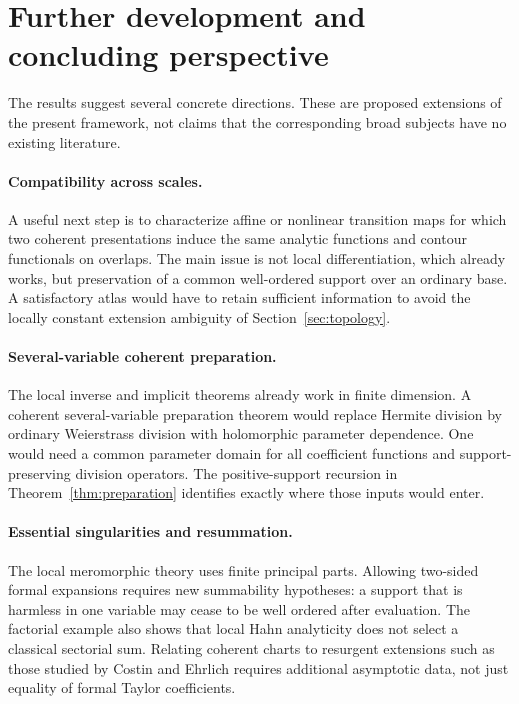 \documentclass[11pt,a4paper]{article}
\theoremstyle{definition}\newtheorem{definition}[theorem]{Definition}
\theoremstyle{remark}\newtheorem{remark}[theorem]{Remark}
\numberwithin{equation}{section}
\begin{document}
\section{Further development and concluding perspective}\label{sec:future}
The results suggest several concrete directions. These are proposed extensions of the present framework, not claims that the corresponding broad subjects have no existing literature.

\paragraph{Compatibility across scales.}
A useful next step is to characterize affine or nonlinear transition maps for which two coherent presentations induce the same analytic functions and contour functionals on overlaps. The main issue is not local differentiation, which already works, but preservation of a common well-ordered support over an ordinary base. A satisfactory atlas would have to retain sufficient information to avoid the locally constant extension ambiguity of Section~\ref{sec:topology}.

\paragraph{Several-variable coherent preparation.}
The local inverse and implicit theorems already work in finite dimension. A coherent several-variable preparation theorem would replace Hermite division by ordinary Weierstrass division with holomorphic parameter dependence. One would need a common parameter domain for all coefficient functions and support-preserving division operators. The positive-support recursion in Theorem~\ref{thm:preparation} identifies exactly where those inputs would enter.

\paragraph{Essential singularities and resummation.}
The local meromorphic theory uses finite principal parts. Allowing two-sided formal expansions requires new summability hypotheses: a support that is harmless in one variable may cease to be well ordered after evaluation. The factorial example also shows that local Hahn analyticity does not select a classical sectorial sum. Relating coherent charts to resurgent extensions such as those studied by Costin and Ehrlich \cite{CostinEhrlich} requires additional asymptotic data, not just equality of formal Taylor coefficients.
\end{document}

